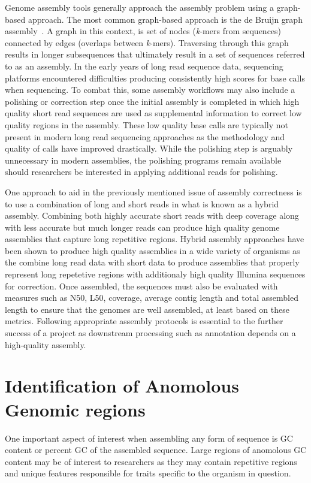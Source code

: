 Genome assembly tools generally approach the assembly problem using a
graph-based approach. The most common graph-based approach is the de
Bruijn graph assembly~\cite{Compeau2011}. A graph in this context, is
set of nodes (\textit{k}-mers from sequences) connected by edges
(overlaps between \textit{k}-mers). Traversing through this graph
results in longer subsequences that ultimately result in a set of
sequences referred to as an assembly. In the early years of long read
sequence data, sequencing platforms encountered difficulties producing
consistently high scores for base calls when sequencing. To combat
this, some assembly workflows may also include a polishing or
correction step once the initial assembly is completed in which high
quality short read sequences are used as supplemental information to
correct low quality regions in the assembly. These low quality base
calls are typically not present in modern long read sequencing
approaches as the methodology and quality of calls have improved
drastically. While the polishing step is arguably unnecessary in
modern assemblies, the polishing programs remain available should
researchers be interested in applying additional reads for polishing.

One approach to aid in the previously mentioned issue of assembly
correctness is to use a combination of long and short reads in what is
known as a hybrid assembly. Combining both highly accurate short reads
with deep coverage along with less accurate but much longer reads can
produce high quality genome assemblies that capture long repetitive
regions. Hybrid assembly approaches have been shown to produce high
quality assemblies in a wide variety of organisms as the combine long
read data with short data to produce assemblies that properly
represent long repetetive regions with additionaly high quality
Illumina sequences for correction. Once assembled, the sequences must
also be evaluated with measures such as N50, L50, coverage, average
contig length and total assembled length to ensure that the genomes
are well assembled, at least based on these
metrics\cite{Nagarajan2013}. Following appropriate assembly protocols
is essential to the further success of a project as downstream
processing such as annotation depends on a high-quality assembly.

\section{Identification of Anomolous Genomic regions}
One important aspect of interest when assembling any form of sequence
is GC content or percent GC of the assembled sequence. Large regions
of anomolous GC content may be of interest to researchers as they may
contain repetitive regions and unique features responsible for traits
specific to the organism in question.



